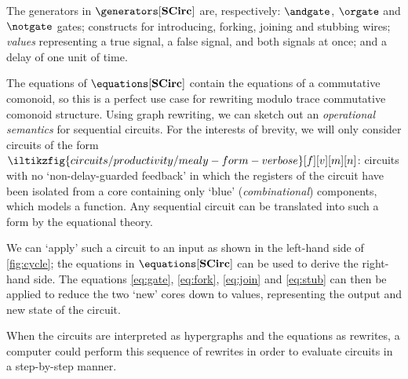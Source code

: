 The generators in \(\generators[\mathbf{SCirc}]\) are, respectively:
\(\andgate\), \(\orgate\) and \(\notgate\) gates; constructs for introducing,
forking, joining and stubbing wires; \emph{values} representing a true signal,
a false signal, and both signals at once; and a delay of one unit of time.

The equations of \(\equations[\mathbf{SCirc}]\) contain the equations of a
commutative comonoid, so this is a perfect use case for rewriting modulo
trace commutative comonoid structure.
Using graph rewriting, we can sketch out an \emph{operational semantics} for
sequential circuits.
For the interests of brevity, we will only consider circuits of the form \(
    \iltikzfig{circuits/productivity/mealy-form-verbose}[f][v][m][n]
\): circuits with no `non-delay-guarded feedback' in which the registers of the
circuit have been isolated from a core containing only `blue'
(\emph{combinational}) components, which models a function.
Any sequential circuit can be translated into such a form by the equational
theory.

We can `apply' such a circuit to an input as shown in the left-hand side of
\iftoggle{conf}{\cref{app:equations},}{}
\cref{fig:cycle}; the equations in
\(\equations[\mathbf{SCirc}]\) can be used to derive the right-hand side.
The equations \eqref{eq:gate}, \eqref{eq:fork}, \eqref{eq:join} and
\eqref{eq:stub} can then be applied to reduce the two `new' cores down to
values, representing the output and new state of the circuit.

When the circuits are interpreted as hypergraphs and the equations as rewrites,
a computer could perform this sequence of rewrites in order to evaluate circuits
in a step-by-step manner.
